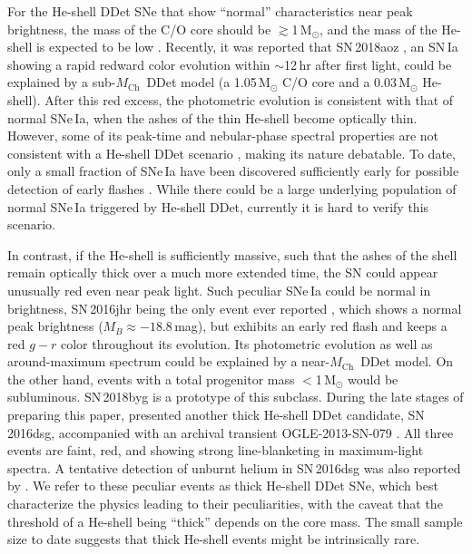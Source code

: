 \documentclass[twocolumn]{aastex631}
\newcommand{\Mch}{$M_\mathrm{Ch}$}
\begin{document}
For the He-shell DDet SNe that show ``normal'' characteristics near peak brightness, the mass of the C/O core should be $\gtrsim$1\,$\mathrm{M_\odot}$, and the mass of the He-shell is expected to be low \citep[$\lesssim$0.03\,$\mathrm{M_\odot}$;][]{polin_observational_2019,Magee_2021,Shen_2D_2021}. Recently, it was reported that SN\,2018aoz \citep{Ni_2022}, an SN\,Ia showing a rapid redward color evolution within $\sim$12\,hr after first light, could be explained by a sub-\Mch\ DDet model (a 1.05\,$\mathrm{M_\odot}$ C/O core and a 0.03\,$\mathrm{M_\odot}$ He-shell). After this red excess, the photometric evolution is consistent with that of normal SNe\,Ia, when the ashes of the thin He-shell become optically thin. However, some of its peak-time and nebular-phase spectral properties are not consistent with a He-shell DDet scenario \citep{Ni_2022b}, making its nature debatable. To date, only a small fraction of SNe\,Ia have been discovered sufficiently early for possible detection of early flashes \citep[e.g.,][]{Deckers_2022}. While there could be a large underlying population of normal SNe\,Ia triggered by He-shell DDet, currently it is hard to verify this scenario. 

In contrast, if the He-shell is sufficiently massive, such that the ashes of the shell remain optically thick over a much more extended time, the SN could appear unusually red even near peak light. Such peculiar SNe\,Ia could be normal in brightness, SN\,2016jhr being the only event ever reported \citep{jiang_16jhr_2017}, which shows a normal peak brightness ($M_B\approx-18.8$\,mag), but exhibits an early red flash and keeps a red $g-r$ color throughout its evolution. Its photometric evolution as well as around-maximum spectrum could be explained by a near-\Mch\ DDet model. %
On the other hand, events with a total progenitor mass $<$1\,$\mathrm{M_\odot}$ would be subluminous. SN\,2018byg \citep{de_18byg_2019} is a prototype of this subclass. During the late stages of preparing this paper, \citet{Dong_16dsg_2022} presented another thick He-shell DDet candidate, SN\,2016dsg, accompanied with an archival transient OGLE-2013-SN-079 \citep{Inserra_OGLE13_079_2015}. All three events are faint, red, and showing strong line-blanketing in maximum-light spectra. A tentative detection of unburnt helium in SN\,2016dsg was also reported by \citet{Dong_16dsg_2022}. We refer to these peculiar events as thick He-shell DDet SNe, which best characterize the physics leading to their peculiarities, with the caveat that the threshold of a He-shell being ``thick'' depends on the core mass. The small sample size to date suggests that thick He-shell events might be intrinsically rare.
\end{document}
